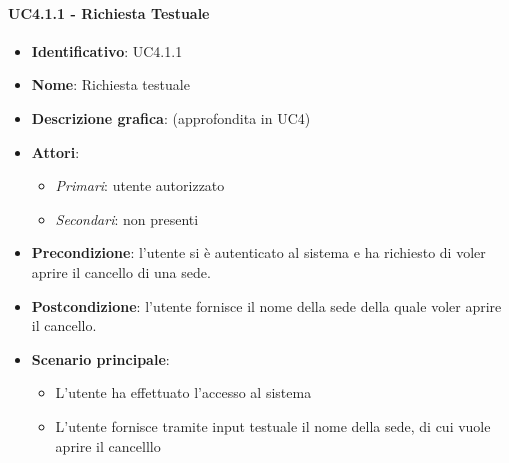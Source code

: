 \paragraph{UC4.1.1 - Richiesta Testuale}
\begin{itemize}
   \item \textbf{Identificativo}: UC4.1.1
   \item \textbf{Nome}: Richiesta testuale
   \item \textbf{Descrizione grafica}: (approfondita in UC4)
   \item \textbf{Attori}:
   \begin{itemize} 
       \item \textit{Primari}: utente autorizzato
       \item \textit{Secondari}: non presenti
   \end{itemize}
       \item \textbf{Precondizione}: l'utente si è autenticato al sistema e ha richiesto di voler aprire il cancello di una sede. 
       \item \textbf{Postcondizione}: l'utente fornisce il nome della sede della quale voler aprire il cancello.
    \item \textbf{Scenario principale}: 
       \begin{itemize}
           \item L'utente ha effettuato l'accesso al sistema 
           \item L'utente fornisce tramite input testuale il nome della sede, di cui vuole aprire il cancelllo
       \end{itemize}
\end{itemize}

